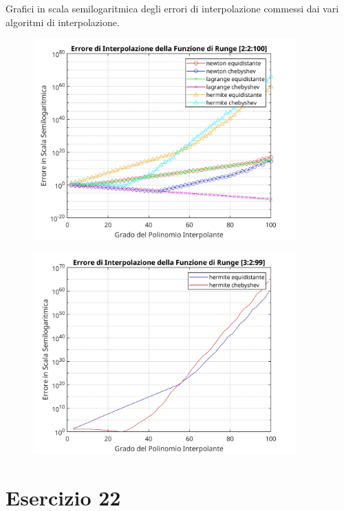 \documentclass[10pt,a4paper]{article}
\begin{document}
Grafici in scala semilogaritmica degli errori di interpolazione commessi dai vari algoritmi di interpolazione.
\begin{figure}[h!]
  \centering
  \includegraphics[width=0.9\textwidth]{../figure/plot21-1}  
\end{figure}
\begin{figure}[h!]
  \centering
  \includegraphics[width=0.9\textwidth]{../figure/plot21-2}  
\end{figure}
\newpage

\section*{Esercizio 22}

\end{document}
